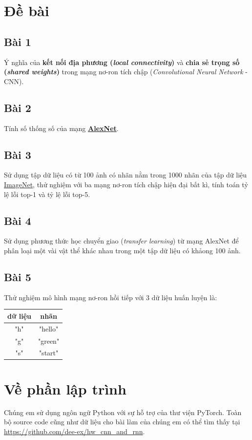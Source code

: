 \documentclass[a4paper]{article}
\begin{document}
\newpage
\tableofcontents
\newpage


\section{Đề bài}

\subsection{Bài 1} Ý nghĩa của \textbf{kết nối địa phương (\textit{local connectivity})} và \textbf{chia sẻ trọng số (\textit{shared weights})} trong mạng nơ-ron tích chập (\textit{Convolutional Neural Network} - CNN).
\subsection{Bài 2} Tính số thống số của mạng \href{https://en.wikipedia.org/wiki/AlexNet}{\textbf{AlexNet}}.
\subsection{Bài 3} Sử dụng tập dữ liệu có từ 100 ảnh có nhãn nằm trong 1000 nhãn của tập dữ liệu \href{http://www.image-net.org/download}{ImageNet}, thử nghiệm với ba mạng nơ-ron tích chập hiện đại bất kì, tính toán tỷ lệ lỗi top-1 và tỷ lệ lỗi top-5.
\subsection{Bài 4} Sử dụng phương thức học chuyển giao (\textit{transfer learning}) từ mạng AlexNet để phân loại một vài vật thể khác nhau trong một tập dữ liệu có khảong 100 ảnh.
\subsection{Bài 5} Thử nghiệm mô hình mạng nơ-ron hồi tiếp với 3 dữ liệu huấn luyện là:
\begin{table}[!h]
\centering
\begin{tabular}{|c|c|}
\hline
\textbf{dữ liệu} & \textbf{nhãn} \\ \hline
"h"              & "hello"       \\ \hline
"g"              & "green"       \\ \hline
"s"              & "start"       \\ \hline
\end{tabular}
\end{table}
\section{Về phần lập trình}
Chúng em sử dụng ngôn ngữ Python với sự hỗ trợ của thư viện PyTorch. Toàn bộ source code cũng như dữ liệu cho bài làm của chúng em có thể tìm thấy tại \href{https://github.com/dee-ex/hw\_cnn\_and\_rnn}{https://github.com/dee-ex/hw\_cnn\_and\_rnn}.
\newpage
\end{document}

